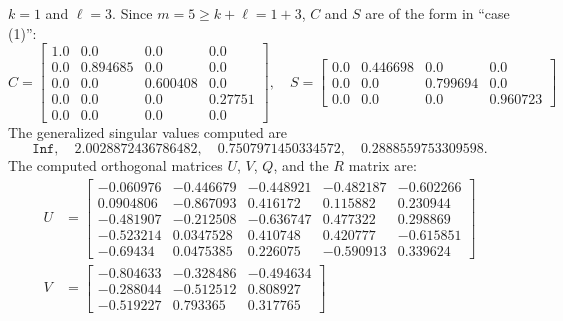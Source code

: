 \begin{example}
{\begin{enumerate}[(1).]
$k = 1$ and $\ell = 3$. Since $m = 5 \geq k+\ell = 1+3$, 
$C$ and $S$ are of the form in ``case (1)'':
\begin{equation*}
C = \begin{bmatrix}
                    1.0 & 0.0      & 0.0      & 0.0  \\
                    0.0 & 0.894685 & 0.0      & 0.0  \\  
                    0.0 & 0.0      & 0.600408 & 0.0  \\  
                    0.0 & 0.0      & 0.0      & 0.27751 \\
                    0.0 & 0.0      & 0.0      & 0.0    
                \end{bmatrix} , \quad
                S = \begin{bmatrix}
                    0.0 & 0.446698 & 0.0      & 0.0   \\  
                    0.0 & 0.0      & 0.799694 & 0.0     \\
                    0.0 & 0.0      & 0.0      & 0.960723
                \end{bmatrix}
            \end{equation*}
The generalized singular values computed are 
\[ 
\texttt{Inf},\quad 
2.0028872436786482, \quad 
0.7507971450334572, \quad
0.2888559753309598.
\] 
The computed orthogonal matrices $U$, $V$, $Q$, and the $R$ matrix are: 
\begin{align*}
                U &= \begin{bmatrix}
                 -0.060976  & -0.446679  & -0.448921 & -0.482187 & -0.602266 \\
                  0.0904806 & -0.867093  &  0.416172 &  0.115882 &  0.230944 \\
                 -0.481907  & -0.212508  & -0.636747 &  0.477322 &  0.298869 \\
                 -0.523214  & 0.0347528  &  0.410748 &  0.420777 & -0.615851 \\
                 -0.69434   & 0.0475385  &  0.226075 & -0.590913 &  0.339624
                \end{bmatrix} \\
                V &= \begin{bmatrix}
                 -0.804633 & -0.328486 & -0.494634 \\
                 -0.288044 & -0.512512 &  0.808927 \\
                 -0.519227 &  0.793365 &  0.317765
                \end{bmatrix} \\

\end{align*}
\end{enumerate}}
\end{example}
